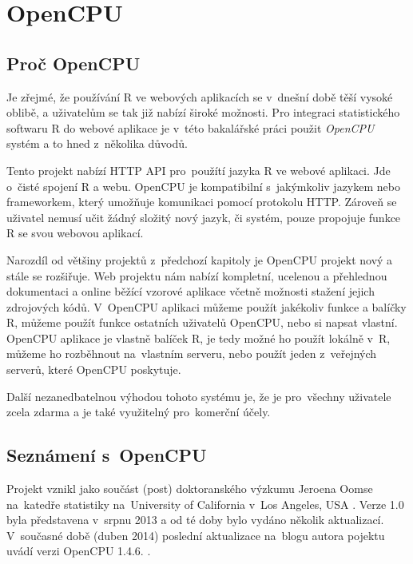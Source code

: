 \documentclass[thesis=B,czech]{FITthesis}[2012/06/26]
\begin{document}
\begin{description}

\end{description}

\section{OpenCPU}

\subsection{Proč OpenCPU}
Je zřejmé, že používání R ve webových aplikacích se v~dnešní době těší vysoké oblibě, a uživatelům se tak již nabízí široké možnosti. Pro integraci statistického softwaru R do webové aplikace je v~této bakalářské práci použit \textit{OpenCPU} systém a to hned z~několika důvodů. 

Tento projekt nabízí HTTP API pro~použítí jazyka R ve webové aplikaci. Jde o~čisté spojení R a webu. OpenCPU je kompatibilní s~jakýmkoliv jazykem nebo frameworkem, který umožňuje komunikaci pomocí protokolu HTTP. Zároveň se uživatel nemusí učit žádný složitý nový jazyk, či systém, pouze propojuje funkce R se svou webovou aplikací. 

Narozdíl od většiny projektů z~předchozí kapitoly je OpenCPU projekt nový a stále se rozšiřuje. Web projektu nám nabízí kompletní, ucelenou a přehlednou dokumentaci a online běžící vzorové aplikace včetně možnosti stažení jejich zdrojových kódů. V~OpenCPU aplikaci můžeme použít jakékoliv funkce a balíčky R, můžeme použít funkce ostatních uživatelů OpenCPU, nebo si napsat vlastní. OpenCPU aplikace je vlastně balíček R, je tedy možné ho použít lokálně v~R, můžeme ho rozběhnout na~vlastním serveru, nebo použít jeden z~veřejných serverů, které OpenCPU poskytuje. 

Další nezanedbatelnou výhodou tohoto systému je, že je pro~všechny uživatele zcela zdarma a je také využitelný pro~komerční účely. 

\subsection{Seznámení s~OpenCPU}
Projekt vznikl jako součást (post) doktoranského výzkumu Jeroena Oomse na~katedře statistiky na~University of California v~Los Angeles, USA \cite{OpenCPU-Papers}. Verze 1.0 byla představena v~srpnu 2013 a od té doby bylo vydáno několik aktualizací. V~současné době (duben 2014) poslední aktualizace na~blogu autora pojektu uvádí verzi OpenCPU 1.4.6. \cite{OpenCPUreaease146}.
\end{document}
